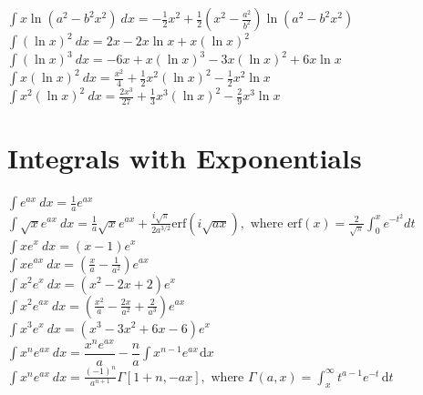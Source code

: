 \documentclass[10pt,letterpaper,landscape]{cheatsheet}
\begin{document}
$
\int x \ln \left( a^2 - b^2 x^2 \right)\ dx = -\frac{1}{2}x^2+ 
\frac{1}{2}\left( x^2 - \frac{a^2}{b^2} \right) \ln \left(a^2 -b^2 x^2 \right) 
$\\

$
\int (\ln x)^2\ dx = 2x - 2x \ln x + x (\ln x)^2
$\\


$
\int (\ln x)^3\ dx = -6 x+x (\ln x)^3-3 x (\ln x)^2+6 x \ln x
$\\
 
 
$
\int x (\ln x)^2\ dx = \frac{x^2}{4}+\frac{1}{2} x^2 (\ln x)^2-\frac{1}{2} x^2 \ln x
$\\

$
\int x^2 (\ln x)^2\ dx = \frac{2 x^3}{27}+\frac{1}{3} x^3 (\ln x)^2-\frac{2}{9} x^3 \ln x
$\\
 
 
 \section*{Integrals with Exponentials}

$
\int e^{ax}\ dx = \frac{1}{a}e^{ax} 
$\\

$
\int \sqrt{x} e^{ax}\ dx = \frac{1}{a}\sqrt{x}e^{ax} 
+\frac{i\sqrt{\pi}}{2a^{3/2}}
\text{erf}\left(i\sqrt{ax}\right),
\text{ where erf}(x)=\frac{2}{\sqrt{\pi}}\int_0^x e^{-t^2}dt
$\\

$
\int x e^x\ dx = (x-1) e^x 
$\\

$
\int x e^{ax}\ dx = \left(\frac{x}{a}-\frac{1}{a^2}\right) e^{ax} 
$\\

$
\int x^2 e^{x}\ dx = \left(x^2 - 2x + 2\right) e^{x}
$\\

$
\int x^2 e^{ax}\ dx = \left(\frac{x^2}{a}-\frac{2x}{a^2}+\frac{2}{a^3}\right) e^{ax} 
$\\

$
\int x^3 e^{x}\ dx = \left(x^3-3x^2 + 6x - 6\right) e^{x} 
$\\
 
$
\int x^n e^{ax}\ dx = \dfrac{x^n e^{ax}}{a} - 
\dfrac{n}{a}\int x^{n-1}e^{ax}\hspace{1pt}\text{d}x
$\\ 
 
$
\int x^n e^{ax}\ dx = \frac{(-1)^n}{a^{n+1}}\Gamma[1+n,-ax], 
 \text{ where } \Gamma(a,x)=\int_x^{\infty} t^{a-1}e^{-t}\hspace{2pt}\text{d}t
 $\\
\end{document}
